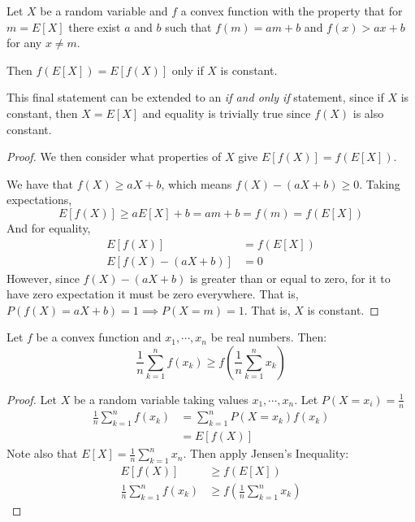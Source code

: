 \documentclass[../Main.tex]{subfiles}
\begin{document}
\begin{corollary}
    Let $X$ be a random variable and $f$ a convex function with the property that for $m = E[X]$ there exist $a$ and $b$ such that $f(m) = am + b$ and $f(x) > ax + b$ for any $x \neq m$.\par
    Then $f(E[X]) = E[f(X)]$ only if $X$ is constant.
    \label{corJensenEquality}
\end{corollary}
\begin{remark}
    This final statement can be extended to an \textit{if and only if} statement, since if $X$ is constant, then $X = E[X]$ and equality is trivially true since $f(X)$ is also constant.
\end{remark}
\begin{proof}
    We then consider what properties of $X$ give $E[f(X)] = f(E[X])$.\par
    We have that $f(X) \geq aX + b$, which means $f(X) - (aX + b) \geq 0$. Taking expectations,
    \begin{equation*}
        E[f(X)] \geq a E[X] + b = am + b = f(m) = f(E[X])
    \end{equation*}
    And for equality,
    \begin{align*}
        E[f(X)] &= f(E[X]) \\
        E[f(X) - (aX + b)] &= 0
    \end{align*}
    However, since $f(X) - (aX + b)$ is greater than or equal to zero, for it to have zero expectation it must be zero everywhere. That is, $P(f(X) = aX + b) = 1 \implies P(X = m) = 1$. That is, $X$ is constant.
\end{proof}
\begin{corollary}
    Let $f$ be a convex function and $x_1, \cdots, x_n$ be real numbers. Then:
    \begin{equation*}
        \frac{1}{n} \sum_{k=1}^n f(x_k) \geq f\left(\frac{1}{n}\sum_{k=1}^n x_k\right)
    \end{equation*}
    \label{corGenericAMGM}
\end{corollary}
\begin{proof}
    Let $X$ be a random variable taking values $x_1, \cdots, x_n$. Let $P(X = x_i) = \frac{1}{n}$
    \begin{align*}
        \frac{1}{n} \sum_{k=1}^n f(x_k) &= \sum_{k=1}^n P(X = x_k) f(x_k) \\
        &= E[f(X)]
    \end{align*}
    Note also that $E[X] = \frac{1}{n} \sum_{k=1}^n x_n$.
    Then apply Jensen's Inequality:
    \begin{align*}
        E[f(X)] &\geq f(E[X]) \\
        \frac{1}{n} \sum_{k=1}^n f(x_k) & \geq f\left(\frac{1}{n} \sum_{k=1}^n x_k\right)
    \end{align*}
\end{proof}
\end{document}
